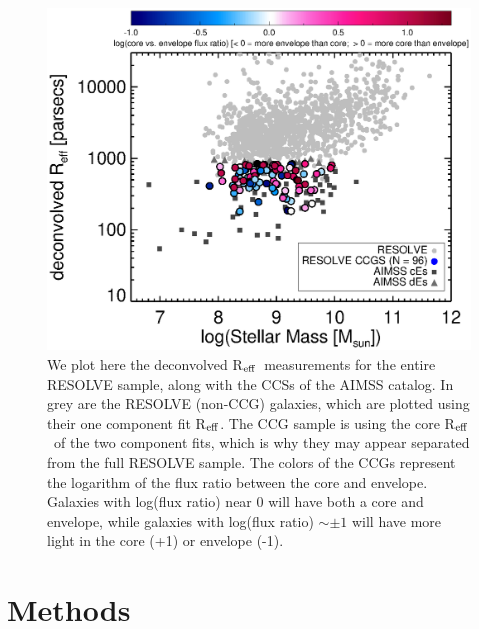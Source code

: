 \documentclass[iop,apj]{emulateapj}
\newcommand{\Reff}{R$_{\rm eff}$}
\begin{document}
\begin{figure}[hbpt!]
\begin{center}
\includegraphics{Reff_Mstars.eps}
\caption{We plot here the deconvolved \Reff\ measurements for the entire RESOLVE sample, along with the CCSs of the AIMSS catalog. In grey are the RESOLVE (non-CCG) galaxies, which are plotted using their one component fit \Reff. The CCG sample is using the core \Reff\ of the two component fits, which is why they may appear separated from the full RESOLVE sample. The colors of the CCGs represent the logarithm of the flux ratio between the core and envelope. Galaxies with log(flux ratio) near 0 will have both a core and envelope, while galaxies with log(flux ratio) $\sim \pm 1$ will have more light in the core (+1) or envelope (-1).}
\label{fig:radius}
\end{center}
\end{figure}

\section{Methods}
\label{methods}
\end{document}
